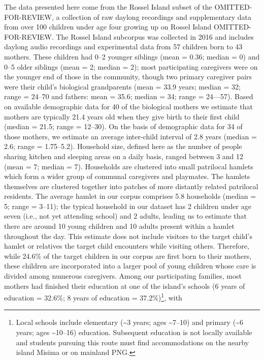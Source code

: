 \documentclass[,man,floatsintext]{apa6}
\let\rmarkdownfootnote\footnote%
\def\footnote{\protect\rmarkdownfootnote}
\begin{document}
The data presented here come from the Rossel Island subset of the
OMITTED-FOR-REVIEW, a collection of raw daylong recordings and
supplementary data from over 100 children under age four growing up on
Rossel Island OMITTED-FOR-REVIEW. The Rossel Island subcorpus was
collected in 2016 and includes daylong audio recordings and experimental
data from 57 children born to 43 mothers. These children had 0--2
younger siblings (mean = 0.36; median = 0) and 0--5 older siblings (mean
= 2; median = 2); most participating caregivers were on the younger end
of those in the community, though two primary caregiver pairs were their
child's biological grandparents (mean = 33.9 years; median = 32; range =
24--70 and fathers: mean = 35.6; median = 34; range = 24---57). Based on
available demographic data for 40 of the biological mothers we estimate
that mothers are typically 21.4 years old when they give birth to their
first child (median = 21.5; range = 12--30). On the basis of demographic
data for 34 of those mothers, we estimate an average inter-child
interval of 2.8 years (median = 2.6; range = 1.75--5.2). Household size,
defined here as the number of people sharing kitchen and sleeping areas
on a daily basis, ranged between 3 and 12 (mean = 7; median = 7).
Households are clustered into small patrilocal hamlets which form a
wider group of communal caregivers and playmates. The hamlets themselves
are clustered together into patches of more distantly related patrilocal
residents. The average hamlet in our corpus comprises 5.8 households
(median = 5; range = 3--11); the typical household in our dataset has 2
children under age seven (i.e., not yet attending school) and 2 adults,
leading us to estimate that there are around 10 young children and 10
adults present within a hamlet throughout the day. This estimate does
not include visitors to the target child's hamlet or relatives the
target child encounters while visiting others. Therefore, while 24.6\%
of the target children in our corpus are first born to their mothers,
these children are incorporated into a larger pool of young children
whose care is divided among numerous caregivers. Among our participating
families, most mothers had finished their education at one of the
island's schools (6 years of education = 32.6\%; 8 years of education =
37.2\%)\footnote{Local schools include elementary (\textasciitilde{}3
  years; ages \textasciitilde{}7--10) and primary (\textasciitilde{}6
  years; ages \textasciitilde{}10--16) education. Subsequent education
  is not locally available and students pursuing this route must find
  accommodations on the nearby island Misima or on mainland PNG.}, with
\end{document}

